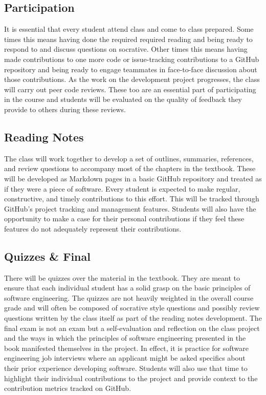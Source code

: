 \documentclass[10pt]{article}
\begin{document}
\subsection*{Participation}

It is essential that every student attend class and come to class prepared. Some times this means having done the required required reading and being ready to respond to and discuss questions on socrative. Other times this means having made contributions to one more code or issue-tracking contributions to a GitHub repository and being ready to engage teammates in face-to-face discussion about those contributions. As the work on the development project progresses, the class will carry out peer code reviews. These too are an essential part of participating in the course and students will be evaluated on the quality of feedback they provide to others during these reviews.

\subsection*{Reading Notes}

The class will work together to develop a set of outlines, summaries, references, and review questions to accompany most of the chapters in the textbook.  These will be developed as Markdown pages in a basic GitHub repository and treated as if they were a piece of software. Every student is expected to make regular, constructive, and timely contributions to this effort. This will be tracked through GitHub's project tracking and management features. Students will also have the opportunity to make a case for their personal contributions if they feel these features do not adequately represent their contributions.

\subsection*{Quizzes \& Final}

There will be quizzes over the material in the textbook. They are meant to ensure that each individual student has a solid grasp on the basic principles of software engineering. The quizzes are not heavily weighted in the overall course grade and will often be composed of socrative style questions and possibly review questions written by the class itself as part of the reading notes development.
The final exam is not an exam but a self-evaluation and reflection on the class project and the ways in which the principles of software engineering presented in the book manifested themselves in the project. In effect, it is practice for software engineering job interviews where an applicant might be asked specifics about their prior experience developing software. Students will also use that time to highlight their individual contributions to the project and provide context to the contribution metrics tracked on GitHub.
\end{document}
